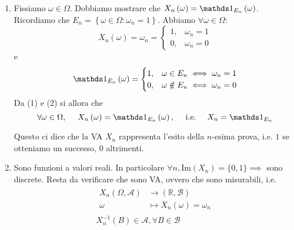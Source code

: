 \begin{enumerate}
\item Fissiamo $\omega \in \Omega $. Dobbiamo mostrare che $X_{n}\left(\omega \right) =\Ind_{E_{n}}\left(\omega \right)$. Ricordiamo che $E_{n} =\left\{\omega \in \Omega :\omega_{n} =1\right\}$. Abbiamo $\forall \omega \in \Omega $:
\begin{equation}
X_{n}\left(\omega \right) =\omega_{n} =
\begin{cases}
1, & \omega_{n} =1\\
0, & \omega_{n} =0
\end{cases}
\end{equation}
e
\begin{equation}
\Ind_{E_{n}}\left(\omega \right) =
\begin{cases}
1, & \omega \in E_{n} \iff \omega_{n} =1\\
0, & \omega \notin E_{n} \iff \omega_{n} =0
\end{cases}
\end{equation}
Da (1) e (2) si allora che
\begin{equation*}
\forall \omega \in \Omega ,\ \ \ \ X_{n}\left(\omega \right) =\Ind_{E_{n}}\left(\omega \right) ,\ \ \ \ \text{i.e.} \ \ \ \ X_{n} =\Ind_{E_{n}}
\end{equation*}

\begin{oss}
Questo ci dice che la VA $X_{n}$ rappresenta l'esito della $n$-esima prova, i.e. $1$ se otteniamo un successo, $0$ altrimenti.
\end{oss}
\item Sono funzioni a valori reali. In particolare $\forall n,\mathrm{Im}(X_{n}) =\{0,1\} \implies $ sono discrete. Resta da verificare che sono VA, ovvero che sono misurabili, i.e.
\begin{gather*}
\begin{aligned}
X_{n}(\Omega ,\mathcal{A}) & \rightarrow (\mathbb{R} ,\mathcal{B})\\
\omega  & \mapsto X_{n}(\omega) =\omega_{n}
\end{aligned}\\
X_{n}^{-1}(B) \in \mathcal{A} ,\forall B\in \mathcal{B}
\end{gather*}


\end{enumerate}
